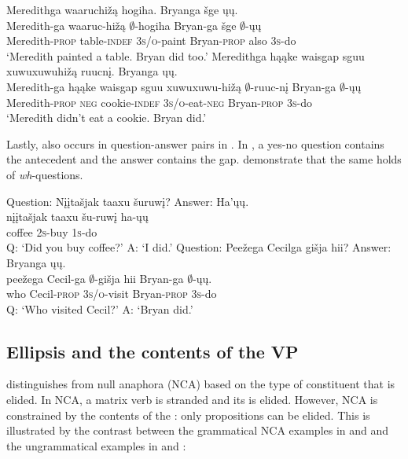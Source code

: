 \documentclass[output=paper]{LSP/langsci}
\begin{document}
\ea\label{ex:johnson:27}
\ea 
\glll Meredithga waaruchižą hogiha. Bryanga šge ųų.\\
Meredith-ga waaruc-hižą $\emptyset$-hogiha Bryan-ga šge $\emptyset$-ųų\\
Meredith-\textsc{prop} table-\textsc{indef} \textsc{3s/o}-paint Bryan-\textsc{prop} also \textsc{3s}-do\\
\trans `Meredith painted a table. Bryan did too.'
\ex 
\glll Meredithga hąąke {waisgap sguu xuwuxuwuhižą} ruucnį. Bryanga ųų.\\
Meredith-ga hąąke {waisgap sguu xuwuxuwu-hižą} $\emptyset$-ruuc-nį Bryan-ga $\emptyset$-ųų\\
Meredith-\textsc{prop} \textsc{neg} cookie-\textsc{indef} \textsc{3s/o}-eat-\textsc{neg} Bryan-\textsc{prop} \textsc{3s}-do\\
\trans `Meredith didn't eat a cookie. Bryan did.'
\z
\z

Lastly,  also occurs in question-answer pairs in . In , a yes-no question contains the antecedent  and the answer contains the gap.  demonstrate that the same holds of \emph{wh}-questions.
 
\ea\label{ex:johnson:28}
\ea\label{ex:johnson:28a} 
\glll Question: {Nįįtašjak taaxu} šuruwį? Answer: Ha'ųų.\\
{} {nįįtašjak taaxu} šu-ruwį {} ha-ųų\\
{} coffee \textsc{2s}-buy {} \textsc{1s}-do\\
 \trans Q: `Did you buy coffee?' A: `I did.' 
\ex\label{ex:johnson:28b} 
\glll Question: Peežega Cecilga {gišja hii}? Answer: Bryanga ųų.\\
{} peežega Cecil-ga $\emptyset$-{gišja hii} {} Bryan-ga $\emptyset$-ųų.\\
{} who Cecil-\textsc{prop} \textsc{3s/o}-visit {} Bryan-\textsc{prop} \textsc{3s}-do\\
\trans Q: `Who visited Cecil?' A: `Bryan did.'
\z
\z


\subsection{Ellipsis and the contents of the VP}\label{sec:johnson:3.2}

\citet{Goldberg2005} distinguishes  from null  anaphora (NCA) based on the type of constituent that is elided. In NCA, a matrix verb is stranded and its  is elided. However, NCA is constrained by the contents of the : only propositions can be elided. This is illustrated by the contrast between the grammatical NCA examples in  and  and the ungrammatical examples in  and :
 
\end{document}
